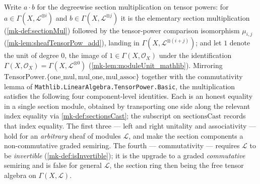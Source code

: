 \begin{lemma}
  \label{mk-lem:sectionMul_coherent}

  Write \(a \cdot b\) for the degreewise section multiplication on tensor powers:
  for \(a \in \Gamma(X, \mathcal{L}^{\otimes i})\) and
  \(b \in \Gamma(X, \mathcal{L}^{\otimes j})\) it is the elementary section
  multiplication (\ref{mk-def:sectionMul}) followed by the tensor-power comparison
  isomorphism \(\mu_{i,j}\) (\ref{mk-lem:sheafTensorPow_add}), landing in
  \(\Gamma(X, \mathcal{L}^{\otimes (i+j)})\); and let \(1\) denote the unit of
  degree \(0\), the image of \(1 \in \Gamma(X,\mathcal{O}_X)\) under the
  identification \(\Gamma(X,\mathcal{O}_X) = \Gamma(X, \mathcal{L}^{\otimes 0})\)
  (\ref{mk-lem:moduleUnit_mathlib}). Mirroring
  \(\mathrm{TensorPower.\{one\_mul, mul\_one, mul\_assoc\}}\) together with the
  commutativity lemma of \texttt{Mathlib.LinearAlgebra.TensorPower.Basic}, the
  multiplication satisfies the following four component-level identities. Each is
  an honest equality in a single section module, obtained by transporting one side
  along the relevant index equality via \ref{mk-def:sectionsCast}; the subscript on
  \(\mathrm{sectionsCast}\) records that index equality. The first three ---
  left and right unitality and associativity --- hold for an \emph{arbitrary}
  sheaf of modules \(\mathcal{L}\), and make the section components a
  non-commutative graded semiring. The fourth --- commutativity --- requires
  \(\mathcal{L}\) to be \emph{invertible} (\ref{mk-def:isInvertible}); it is the
  upgrade to a graded \emph{commutative} semiring and is false for general
  \(\mathcal{L}\), the section ring then being the free tensor algebra on
  \(\Gamma(X,\mathcal{L})\).

\end{lemma}
